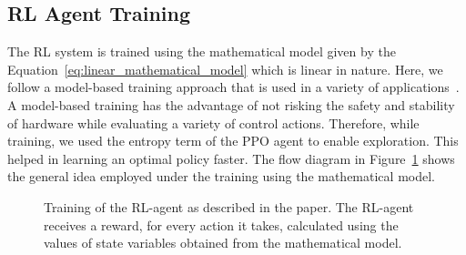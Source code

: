 \subsection{RL Agent Training}\label{subsec:Training}
The RL system is trained using the mathematical model given by the Equation~\ref{eq:linear_mathematical_model} which is linear in nature. Here, we follow a model-based training approach that is used in a variety of applications~\cite{williams2017information}. A model-based training has the advantage of not risking the safety and stability of hardware while evaluating a variety of control actions. Therefore, while training, we used the entropy term of the PPO agent to enable exploration.
This helped in learning an optimal policy faster. The flow diagram in Figure~\ref{fig:flow_chart_learning} 
shows the general idea employed under the training using the mathematical model.

\begin{figure}[htb]
\vspace{-0.5cm}
\caption{Training of the RL-agent as described in the paper. The RL-agent receives a reward, for every action it takes, calculated using the values of state variables obtained from the mathematical model.}
\label{fig:flow_chart_learning}
\end{figure}

